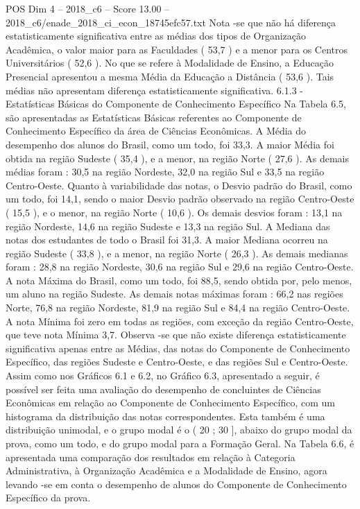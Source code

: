 \begin{textsample}{POS Dim 4 – 2018\_c6 – Score 13.00 – 2018\_c6/enade\_2018\_ci\_econ\_18745efc57.txt}
Nota -se que não há diferença estatisticamente significativa entre as médias dos tipos de Organização Acadêmica, o valor maior para as Faculdades ( 53,7 ) e a menor para os Centros Universitários ( 52,6 ).
No que se refere à Modalidade de Ensino, a Educação Presencial apresentou a mesma Média da Educação a Distância ( 53,6 ).
Tais médias não apresentam diferença estatisticamente significativa. 6.1.3 - Estatísticas Básicas do Componente de Conhecimento Específico Na Tabela 6.5, são apresentadas as Estatísticas Básicas referentes ao Componente de Conhecimento Específico da área de Ciências Econômicas.
A Média do desempenho dos alunos do Brasil, como um todo, foi 33,3.
A maior Média foi obtida na região Sudeste ( 35,4 ), e a menor, na região Norte ( 27,6 ).
As demais médias foram : 30,5 na região Nordeste, 32,0 na região Sul e 33,5 na região Centro-Oeste.
Quanto à variabilidade das notas, o Desvio padrão do Brasil, como um todo, foi 14,1, sendo o maior Desvio padrão observado na região Centro-Oeste ( 15,5 ), e o menor, na região Norte ( 10,6 ).
Os demais desvios foram : 13,1 na região Nordeste, 14,6 na região Sudeste e 13,3 na região Sul.
A Mediana das notas dos estudantes de todo o Brasil foi 31,3.
A maior Mediana ocorreu na região Sudeste ( 33,8 ), e a menor, na região Norte ( 26,3 ).
As demais medianas foram : 28,8 na região Nordeste, 30,6 na região Sul e 29,6 na região Centro-Oeste.
A nota Máxima do Brasil, como um todo, foi 88,5, sendo obtida por, pelo menos, um aluno na região Sudeste.
As demais notas máximas foram : 66,2 nas regiões Norte, 76,8 na região Nordeste, 81,9 na região Sul e 84,4 na região Centro-Oeste.
A nota Mínima foi zero em todas as regiões, com exceção da região Centro-Oeste, que teve nota Mínima 3,7.
Observa -se que não existe diferença estatisticamente significativa apenas entre as Médias, das notas do Componente de Conhecimento Específico, das regiões Sudeste e Centro-Oeste, e das regiões Sul e Centro-Oeste.
Assim como nos Gráficos 6.1 e 6.2, no Gráfico 6.3, apresentado a seguir, é possível ser feita uma avaliação do desempenho de concluintes de Ciências Econômicas em relação ao Componente de Conhecimento Específico, com um histograma da distribuição das notas correspondentes.
Esta também é uma distribuição unimodal, e o grupo modal é o ( 20 ; 30 ], abaixo do grupo modal da prova, como um todo, e do grupo modal para a Formação Geral.
Na Tabela 6.6, é apresentada uma comparação dos resultados em relação à Categoria Administrativa, à Organização Acadêmica e a Modalidade de Ensino, agora levando -se em conta o desempenho de alunos do Componente de Conhecimento Específico da prova.

\end{textsample}
